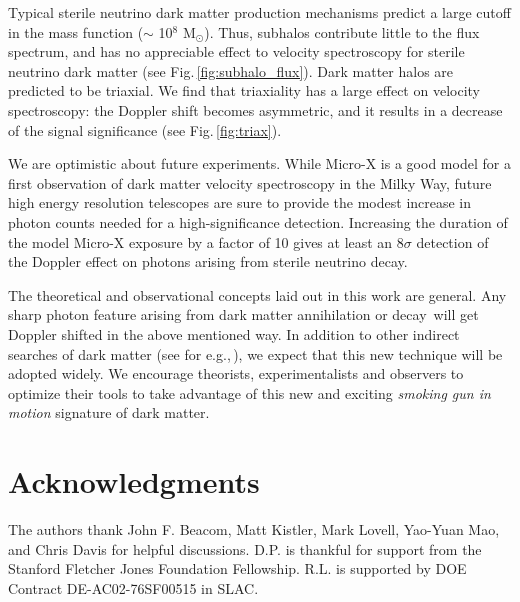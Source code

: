 \documentclass[aps,prd,10pt,twocolumn,superscriptaddress,showpacs,footinbib]{revtex4-1}
\begin{document}
Typical sterile neutrino dark matter production mechanisms predict a large cutoff in the mass function ($\sim$ 10$^8$ M$_\odot$).  Thus, subhalos contribute little to the flux spectrum, and has no appreciable effect to velocity spectroscopy for sterile neutrino dark matter (see Fig.\,\ref{fig:subhalo_flux}).  Dark matter halos are predicted to be triaxial.  We find that triaxiality has a large effect on velocity spectroscopy: the Doppler shift becomes asymmetric, and it results in a decrease of the signal significance (see Fig.\,\ref{fig:triax}).

We are optimistic about future experiments. While Micro-X is a good model for a first observation of dark matter velocity
spectroscopy in the Milky Way, future high energy resolution telescopes are sure to provide the
modest increase in photon counts needed for a high-significance detection. Increasing the duration
of the model Micro-X exposure by a factor of 10 gives at least an $8\sigma$ detection of the Doppler
effect on photons arising from sterile neutrino decay.

The theoretical and
observational concepts laid out in this work are general.  Any sharp photon feature arising from dark matter annihilation or decay\,\cite{Boddy:2015efa,Ibarra:2013eda} will get Doppler shifted in the above mentioned way.  In addition to other indirect searches of dark matter (see for e.g.,\,\cite{Yuksel:2007dr,Dasgupta:2012bd,Laha:2012fg,Ng:2013xha,Murase:2015gea,Chowdhury:2016bxs}), we expect that this new technique will be adopted widely.  We encourage theorists, experimentalists and observers to optimize their tools to take advantage of this new and exciting {\it smoking gun in motion} signature of dark matter.  

 
	

\section*{Acknowledgments} 

The authors thank John F. Beacom, Matt Kistler, Mark Lovell, Yao-Yuan Mao, and Chris Davis for helpful discussions. D.P. is
thankful for support from the Stanford Fletcher Jones Foundation Fellowship.  R.L. is supported by DOE Contract DE-AC02-76SF00515 in SLAC.


\newcommand{\mnras}[0]{M.N.R.A.S.}
%
%	
	
\end{document}
